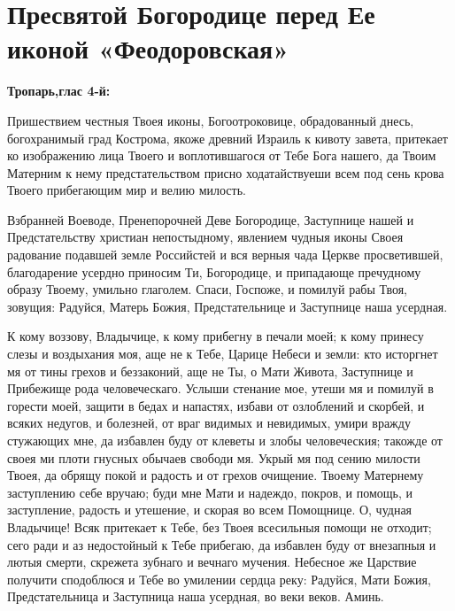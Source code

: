 \newpage\section{Пресвятой Богородице перед Ее иконой «Феодоровская»}
 
\bfseries Тропарь,глас 4-й:\normalfont{}


Пришествием честныя Твоея иконы, Богоотроковице, обрадованный днесь, богохранимый град Кострома, якоже древний Израиль к кивоту завета, притекает ко изображению лица Твоего и воплотившагося от Тебе Бога нашего, да Твоим Матерним к нему предстательством присно ходатайствуеши всем под сень крова Твоего прибегающим мир и велию милость.




Взбранней Воеводе, Пренепорочней Деве Богородице, Заступнице нашей и Предстательству христиан непостыдному, явлением чудныя иконы Своея радование подавшей земле Российстей и вся верныя чада Церкве просветившей, благодарение усердно приносим Ти, Богородице, и припадающе пречудному образу Твоему, умильно глаголем. Спаси, Госпоже, и помилуй рабы Твоя, зовущия: Радуйся, Матерь Божия, Предстательнице и Заступнице наша усердная.




К кому воззову, Владычице, к кому прибегну в печали моей; к кому принесу слезы и воздыхания моя, аще не к Тебе, Царице Небеси и земли: кто исторгнет мя от тины грехов и беззаконий, аще не Ты, о Мати Живота, Заступнице и Прибежище рода человеческаго. Услыши стенание мое, утеши мя и помилуй в горести моей, защити в бедах и напастях, избави от озлоблений и скорбей, и всяких недугов, и болезней, от враг видимых и невидимых, умири вражду стужающих мне, да избавлен буду от клеветы и злобы человеческия; такожде от своея ми плоти гнусных обычаев свободи мя. Укрый мя под сению милости Твоея, да обрящу покой и радость и от грехов очищение. Твоему Матернему заступлению себе вручаю; буди мне Мати и надеждо, покров, и помощь, и заступление, радость и утешение, и скорая во всем Помощнице. О, чудная Владычице! Всяк притекает к Тебе, без Твоея всесильныя помощи не отходит; сего ради и аз недостойный к Тебе прибегаю, да избавлен буду от внезапныя и лютыя смерти, скрежета зубнаго и вечнаго мучения. Небесное же Царствие получити сподоблюся и Тебе во умилении сердца реку: Радуйся, Мати Божия, Предстательница и Заступница наша усердная, во веки веков. Аминь.\mychapterending

